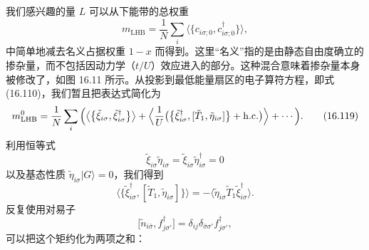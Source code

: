 我们感兴趣的量 $L$ 可以从下能带的总权重
\begin{equation*}
m_{\mathrm{LHB}}=\frac{1}{N}\sum_{i}\big\langle\bigl\{c_{i\sigma;0},c_{i\sigma;0}^{\dagger}\bigr\}\big\rangle,\tag{16.118}
\end{equation*}
中简单地减去名义占据权重 $1-x$ 而得到。这里“名义”指的是由静态自由度确立的掺杂量，而不包括因动力学（$t/U$）效应进入的部分。这种混合意味着掺杂量本身被修改了，如图 16.11 所示。从投影到最低能量扇区的电子算符方程，即式 (16.110)，我们暂且把表达式简化为
\begin{equation*}
m_{\mathrm{LHB}}^{0}=\frac{1}{N}\sum_{i}\Big(\bigl\langle\bigl\{\tilde{\xi}_{i\sigma},\tilde{\xi}_{i\sigma}^{\dagger}\bigr\}\bigr\rangle+\Bigl\langle\frac{1}{U}\bigl(\bigl\{\tilde{\xi}_{i\sigma}^{\dagger},[\tilde{T}_{1},\tilde{\eta}_{i\sigma}]\bigr\}+\mathrm{h.c.}\bigr)\Bigr\rangle+\cdots\Big).\tag{16.119}
\end{equation*}
利用恒等式
\begin{equation*}
\tilde{\xi}_{i\sigma}\tilde{\eta}_{i\sigma}=\tilde{\xi}_{i\sigma}\tilde{\eta}_{i\sigma}^{\dagger}=0\tag{16.120}
\end{equation*}
以及基态性质 $\tilde{\eta}_{i\sigma}|G\rangle=0$，我们得到
\begin{equation*}
\big\langle\bigl\{\tilde{\xi}_{i\sigma}^{\dagger},[\tilde{T}_{1},\tilde{\eta}_{i\sigma}]\bigr\}\big\rangle=-\langle\tilde{\eta}_{i\sigma}\tilde{T}_{1}\tilde{\xi}_{i\sigma}^{\dagger}\rangle.\tag{16.121}
\end{equation*}
反复使用对易子
\begin{equation*}
\big[\tilde{n}_{i\bar{\sigma}},f_{j\sigma'}^{\dagger}\big]=\delta_{ij}\delta_{\bar{\sigma}\sigma'}f_{j\sigma'}^{\dagger},\tag{16.122}
\end{equation*}
可以把这个矩约化为两项之和：
